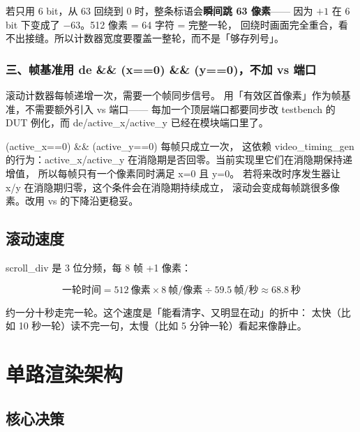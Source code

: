 \documentclass[10pt,a4paper]{article}
\newcommand{\sig}[1]{{\ttfamily\small #1}}
\newcommand{\code}[1]{{\ttfamily\small #1}}
\begin{document}
若只用 6 bit，从 63 回绕到 0 时，整条标语会\textbf{瞬间跳 63 像素}——
因为 $+1$ 在 6 bit 下变成了 $-63$。512 像素 = 64 字符 = 完整一轮，
回绕时画面完全重合，看不出接缝。所以计数器宽度要覆盖一整轮，而不是「够存列号」。

\subsubsection*{三、帧基准用 \code{de \&\& (x==0) \&\& (y==0)}，不加 vs 端口}

滚动计数器每帧递增一次，需要一个帧同步信号。
用「有效区首像素」作为帧基准，不需要额外引入 \sig{vs} 端口——
每加一个顶层端口都要同步改 testbench 的 DUT 例化，而 \code{de}/\code{active\_x}/\code{active\_y}
已经在模块端口里了。

\begin{dswarn}[这个帧基准有一个前提]
\code{(active\_x==0) \&\& (active\_y==0)} 每帧只成立一次，
这依赖 \sig{video\_timing\_gen} 的行为：\code{active\_x}/\code{active\_y}
在消隐期是否回零。当前实现里它们在消隐期保持递增值，
所以每帧只有一个像素同时满足 x=0 且 y=0。
若将来改时序发生器让 x/y 在消隐期归零，这个条件会在消隐期持续成立，
滚动会变成每帧跳很多像素。改用 \sig{vs} 的下降沿更稳妥。
\end{dswarn}

\subsection{滚动速度}

\code{scroll\_div} 是 3 位分频，每 8 帧 +1 像素：

\[
\text{一轮时间} = 512\ \text{像素} \times 8\ \text{帧/像素} \div 59.5\ \text{帧/秒}
\approx 68.8\ \text{秒}
\]

约一分十秒走完一轮。这个速度是「能看清字、又明显在动」的折中：
太快（比如 10 秒一轮）读不完一句，太慢（比如 5 分钟一轮）看起来像静止。

\section{单路渲染架构}
\label{sec:arch}
\label{sec:single}

\subsection{核心决策}
\end{document}

